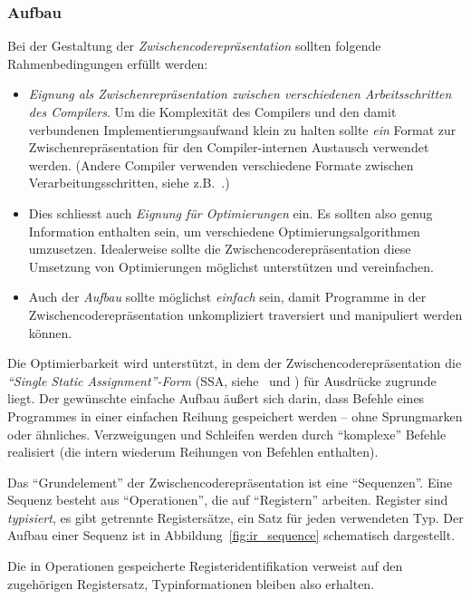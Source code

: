 \documentclass[twoside,a4paper,fleqn,12pt]{article}
\begin{document}
\subsubsection{Aufbau}

Bei der Gestaltung der \emph{Zwischencoderepräsentation} sollten folgende Rahmenbedingungen erfüllt werden:
\begin{itemize}
\item \emph{Eignung als Zwischenrepräsentation zwischen verschiedenen Arbeitsschritten des Compilers}.
Um die Komplexität des Compilers und den damit verbundenen Implementierungsaufwand klein zu halten
sollte \emph{ein} Format zur Zwischenrepräsentation für den Compiler-internen Austausch verwendet werden.
(Andere Compiler verwenden verschiedene Formate zwischen Verarbeitungsschritten, siehe z.B.~\cite{SIMPLE}.)
\item Dies schliesst auch \emph{Eignung für Optimierungen} ein. Es sollten also genug Information enthalten sein,
um verschiedene Optimierungsalgorithmen umzusetzen. Idealerweise sollte die Zwischencoderepräsentation
diese Umsetzung von Optimierungen möglichst unterstützen und vereinfachen.
\item Auch der \emph{Aufbau} sollte möglichst \emph{einfach} sein, damit Programme in der Zwischencoderepräsentation 
unkompliziert traversiert und manipuliert werden können.
\end{itemize}

Die Optimierbarkeit wird unterstützt, in dem der Zwischencoderepräsentation die \emph{``Single Static Assignment''-Form} (SSA, siehe~\cite{ssa1} und \cite{ssa2})
für Ausdrücke zugrunde liegt. Der gewünschte einfache Aufbau äußert sich darin, dass Befehle eines Programmes
in einer einfachen Reihung gespeichert werden -- ohne Sprungmarken oder ähnliches. Verzweigungen und Schleifen werden
durch "`komplexe"' Befehle realisiert (die intern wiederum Reihungen von Befehlen enthalten).

Das "`Grundelement"' der Zwischencoderepräsentation ist eine "`Sequenzen"'. Eine Sequenz besteht aus "`Operationen"',
die auf "`Registern"' arbeiten. Register sind \emph{typisiert}, es gibt getrennte Registersätze, ein Satz für jeden verwendeten Typ. 
Der Aufbau einer Sequenz ist in Abbildung~\ref{fig:ir_sequence} schematisch dargestellt.

Die in Operationen gespeicherte Registeridentifikation verweist auf den zugehörigen Registersatz, Typinformationen bleiben also erhalten.
\end{document}
